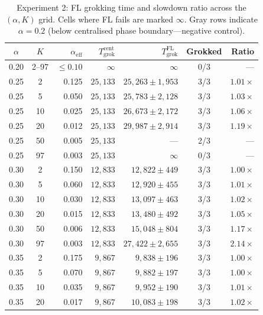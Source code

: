 \documentclass[11pt]{article}
\begin{document}
\begin{table}[h]
\centering
\caption{Experiment 2: FL grokking time and slowdown ratio across the $(\alpha, K)$ grid.
Cells where FL fails are marked $\infty$.
Gray rows indicate $\alpha = 0.2$ (below centralised phase boundary---negative control).}
\label{tab:exp2}
\small
\begin{tabular}{ccrrrcr}
\toprule
$\alpha$ & $K$ & $\alpha_{\text{eff}}$ & $T_{\text{grok}}^{\text{cent}}$ & $T_{\text{grok}}^{\text{FL}}$ & Grokked & Ratio \\
\midrule
\rowcolor{gray!15} 0.20 & 2--97 & $\leq 0.10$ & $\infty$ & $\infty$ & 0/3 & --- \\
\midrule
0.25 &  2 & 0.125 & $25{,}133$ & $25{,}263 \pm 1{,}953$ & 3/3 & $1.01\times$ \\
0.25 &  5 & 0.050 & $25{,}133$ & $25{,}783 \pm 2{,}128$ & 3/3 & $1.03\times$ \\
0.25 & 10 & 0.025 & $25{,}133$ & $26{,}673 \pm 2{,}172$ & 3/3 & $1.06\times$ \\
0.25 & 20 & 0.012 & $25{,}133$ & $29{,}987 \pm 2{,}914$ & 3/3 & $1.19\times$ \\
\rowcolor{nogrokred!10}
0.25 & 50 & 0.005 & $25{,}133$ & --- & 2/3 & --- \\
\rowcolor{nogrokred!10}
0.25 & 97 & 0.003 & $25{,}133$ & $\infty$ & 0/3 & --- \\
\midrule
0.30 &  2 & 0.150 & $12{,}833$ & $12{,}822 \pm 449$ & 3/3 & $1.00\times$ \\
0.30 &  5 & 0.060 & $12{,}833$ & $12{,}920 \pm 455$ & 3/3 & $1.01\times$ \\
0.30 & 10 & 0.030 & $12{,}833$ & $13{,}097 \pm 463$ & 3/3 & $1.02\times$ \\
0.30 & 20 & 0.015 & $12{,}833$ & $13{,}480 \pm 492$ & 3/3 & $1.05\times$ \\
0.30 & 50 & 0.006 & $12{,}833$ & $15{,}048 \pm 804$ & 3/3 & $1.17\times$ \\
0.30 & 97 & 0.003 & $12{,}833$ & $27{,}422 \pm 2{,}655$ & 3/3 & $2.14\times$ \\
\midrule
0.35 &  2 & 0.175 & $\phantom{0}9{,}867$ & $\phantom{0}9{,}838 \pm 196$ & 3/3 & $1.00\times$ \\
0.35 &  5 & 0.070 & $\phantom{0}9{,}867$ & $\phantom{0}9{,}882 \pm 197$ & 3/3 & $1.00\times$ \\
0.35 & 10 & 0.035 & $\phantom{0}9{,}867$ & $\phantom{0}9{,}952 \pm 190$ & 3/3 & $1.01\times$ \\
0.35 & 20 & 0.017 & $\phantom{0}9{,}867$ & $10{,}083 \pm 198$ & 3/3 & $1.02\times$ \\

\end{tabular}
\end{table}
\end{document}
